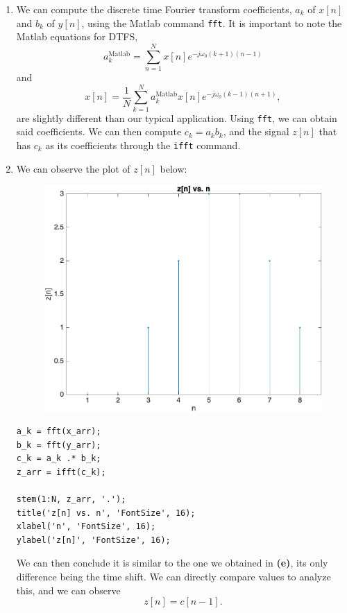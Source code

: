 \documentclass[12pt]{article}
\begin{document}
\begin{enumerate}[label=\textbf{\alph*)}, leftmargin=2.6em]
\item We can compute the discrete time Fourier transform coefficients, $a_k$ of $x[n]$ and $b_k$ of $y[n]$, using the Matlab command \verb|fft|. It is important to note the Matlab equations for DTFS,
\begin{equation}
    a_k^{\text{Matlab}}=\sum_{n=1}^N x[n]e^{-j\omega_0(k+1)(n-1)}
\end{equation}
and
\begin{equation}
    x[n]=\frac{1}{N}\sum_{k=1}^N a_k^{\text{Matlab}}x[n]e^{-j\omega_0(k-1)(n+1)},
\end{equation}
are slightly different than our typical application. Using \verb|fft|, we can obtain said coefficients. We can then compute $c_k=a_kb_k$, and the signal $z[n]$ that has $c_k$ as its coefficients through the \verb|ifft| command. 

\item We can observe the plot of $z[n]$ below:
\begin{figure} [H]
    \centering
    \includegraphics[width=0.5\linewidth]{ifft1.png}
\end{figure}
\begin{verbatim}
a_k = fft(x_arr);
b_k = fft(y_arr);
c_k = a_k .* b_k;
z_arr = ifft(c_k);

stem(1:N, z_arr, '.');
title('z[n] vs. n', 'FontSize', 16);
xlabel('n', 'FontSize', 16);
ylabel('z[n]', 'FontSize', 16);
\end{verbatim}
We can then conclude it is similar to the one we obtained in \textbf{(e)}, its only difference being the time shift. We can directly compare values to analyze this, and we can observe
\begin{equation}
    z[n]=c[n-1].
\end{equation}


\end{enumerate}
\end{document}
